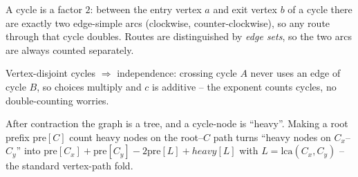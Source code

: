 \begin{observation}
A cycle is a factor \(2\): between the entry vertex \(a\) and exit vertex \(b\) of a
cycle there are exactly two edge-simple arcs (clockwise, counter-clockwise), so any
route through that cycle doubles.  Routes are distinguished by \emph{edge sets}, so
the two arcs are always counted separately.
\end{observation}
\begin{observation}
Vertex-disjoint cycles \(\Rightarrow\) independence: crossing cycle \(A\) never uses an
edge of cycle \(B\), so choices multiply and \(c\) is additive -- the exponent counts
cycles, no double-counting worries.
\end{observation}
\begin{observation}
After contraction the graph is a tree, and a cycle-node is ``heavy''.  Making a root
prefix \(\mathrm{pre}[C]\) count heavy nodes on the root--\(C\) path turns
``heavy nodes on \(C_x\)--\(C_y\)'' into \(\mathrm{pre}[C_x]+\mathrm{pre}[C_y]-2\mathrm{pre}[L]+\mathit{heavy}[L]\)
with \(L=\mathrm{lca}(C_x,C_y)\) -- the standard vertex-path fold.
\end{observation}

\begin{thinkbox}
\end{thinkbox}

